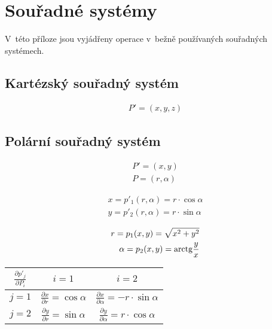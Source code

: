\chapter{Souřadné systémy}

V~této příloze jsou vyjádřeny operace v~bežně používaných souřadných systémech.

\section{Kartézský souřadný systém}

\begin{equation}
\begin{split}
P' = (x, y, z)
\end{split}
\end{equation}

\section{Polární souřadný systém}

\begin{equation}
\begin{split}
P' = (x, y) \\
P = (r, \alpha)
\end{split}
\end{equation}

\begin{equation}
\begin{split}
x = p'_1(r, \alpha) = r \cdot \cos \alpha \\
y = p'_2(r, \alpha) = r \cdot \sin \alpha
\end{split}
\end{equation}

\begin{equation}
\begin{split}
r = p_1(x, y) = \sqrt{x^2 + y^2} \\
\alpha = p_2(x, y) = \mathrm{arctg} \frac{y}{x}
\end{split}
\end{equation}

\begin{tabular}{| c || c | c |}
\hline
\(\frac{\partial p'_j}{\partial P_i}\) & \(i=1\) & \(i=2\) \\
\hline
\hline
\(j=1\) & \(\frac{\partial x}{\partial r} = \cos \alpha\) & \(\frac{\partial x}{\partial \alpha} = -r \cdot \sin \alpha\) \\
\hline
\(j=2\) & \(\frac{\partial y}{\partial r} = \sin \alpha\) & \(\frac{\partial y}{\partial \alpha} = r \cdot \cos \alpha\) \\
\hline
\end{tabular}

